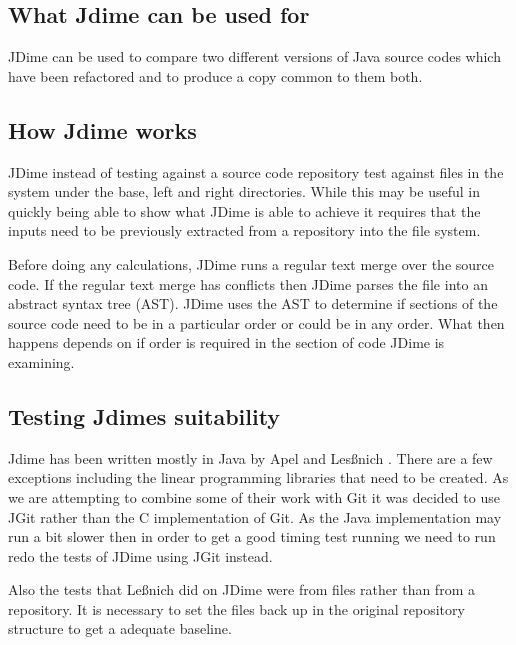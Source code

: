 \subsection{What Jdime can be used for}
JDime can be used to compare two different versions of Java source codes which have been refactored and to produce a copy common to them both. 

\subsection{How Jdime works}
JDime instead of testing against a source code repository test against files in the system under the base, left and right directories.
While this may be useful in quickly being able to show what JDime is able to achieve it requires that the inputs need to be previously extracted from a repository into the file system.

Before doing any calculations, JDime runs a regular text merge over the source code.  
If the regular text merge has conflicts then JDime parses the file into an abstract syntax tree (AST).  JDime uses the AST to determine if sections of the source code need to be in a particular order or could be in any order.
What then happens depends on if order is required in the section of code JDime is examining.

\subsection{Testing Jdimes suitability}

Jdime has been written mostly in Java by Apel and Les{\ss}nich \cite{Apel2012} .  There are a few exceptions including the linear programming libraries that need to be created.  As we are attempting to combine some of their work with Git it was decided to use JGit rather than the C implementation of Git. As the Java implementation may run a bit slower then in order to get a good timing test running we need to run redo the tests of JDime using JGit instead. 

Also the tests that Le{\ss}nich did on JDime were from files rather than from a repository. It is necessary to set the files back up in the original repository structure to get a adequate baseline.

